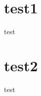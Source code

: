 \documentclass{beamer}
\begin{document}
    \frame{
        \titlepage
    }

    \section{test1}

    \begin{frame}
        test
    \end{frame}

    \section{test2}

    \begin{frame}
        test
    \end{frame}
\end{document}
